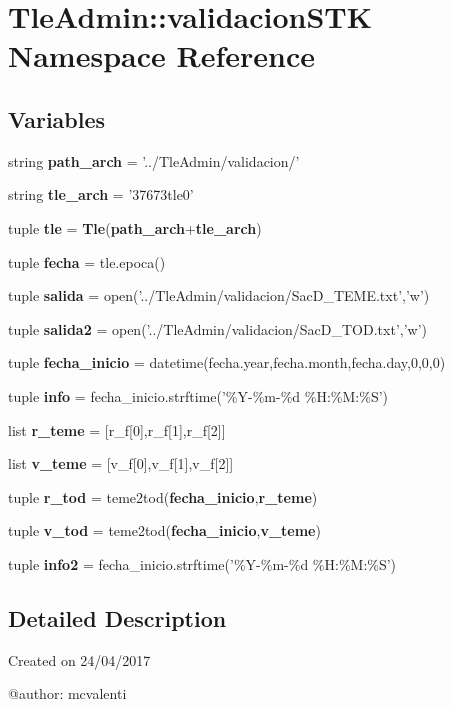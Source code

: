 \section{\-Tle\-Admin\-:\-:validacion\-S\-T\-K \-Namespace \-Reference}
\label{namespace_tle_admin_1_1validacion_s_t_k}
\subsection*{\-Variables}
\begin{DoxyCompactItemize}
\item 
string {\bf path\-\_\-arch} = '../\-Tle\-Admin/validacion/'
\item 
string {\bf tle\-\_\-arch} = '37673tle0'
\item 
tuple {\bf tle} = {\bf \-Tle}({\bf path\-\_\-arch}+{\bf tle\-\_\-arch})
\item 
tuple {\bf fecha} = tle.\-epoca()
\item 
tuple {\bf salida} = open('../\-Tle\-Admin/validacion/\-Sac\-D\-\_\-\-T\-E\-M\-E.\-txt','w')
\item 
tuple {\bf salida2} = open('../\-Tle\-Admin/validacion/\-Sac\-D\-\_\-\-T\-O\-D.\-txt','w')
\item 
tuple {\bf fecha\-\_\-inicio} = datetime(fecha.\-year,fecha.\-month,fecha.\-day,0,0,0)
\item 
tuple {\bf info} = fecha\-\_\-inicio.\-strftime('\%\-Y-\/\%m-\/\%d \%\-H\-:\%\-M\-:\%\-S')
\item 
list {\bf r\-\_\-teme} = [r\-\_\-f[0],r\-\_\-f[1],r\-\_\-f[2]]
\item 
list {\bf v\-\_\-teme} = [v\-\_\-f[0],v\-\_\-f[1],v\-\_\-f[2]]
\item 
tuple {\bf r\-\_\-tod} = teme2tod({\bf fecha\-\_\-inicio},{\bf r\-\_\-teme})
\item 
tuple {\bf v\-\_\-tod} = teme2tod({\bf fecha\-\_\-inicio},{\bf v\-\_\-teme})
\item 
tuple {\bf info2} = fecha\-\_\-inicio.\-strftime('\%\-Y-\/\%m-\/\%d \%\-H\-:\%\-M\-:\%\-S')
\end{DoxyCompactItemize}


\subsection{\-Detailed \-Description}
\begin{DoxyVerb}
Created on 24/04/2017

@author: mcvalenti
\end{DoxyVerb}
 

